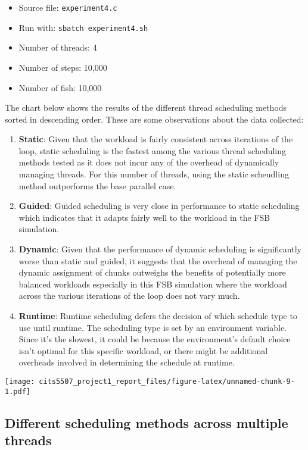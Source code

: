 \documentclass[
]{article}
\providecommand{\tightlist}{%
  \setlength{\itemsep}{0pt}\setlength{\parskip}{0pt}}
\begin{document}
\begin{itemize}
\tightlist
\item
  Source file: \texttt{experiment4.c}
\item
  Run with: \texttt{sbatch\ experiment4.sh}
\item
  Number of threads: 4
\item
  Number of steps: 10,000
\item
  Number of fish: 10,000
\end{itemize}

The chart below shows the results of the different thread scheduling
methods sorted in descending order. These are some observations about
the data collected:

\begin{enumerate}
\def\labelenumi{\arabic{enumi}.}
\item
  \textbf{Static}: Given that the workload is fairly consistent across
  iterations of the loop, static scheduling is the fastest among the
  various thread scheduling methods tested as it does not incur any of
  the overhead of dynamically managing threads. For this number of
  threads, using the static scheudling method outperforms the base
  parallel case.
\item
  \textbf{Guided}: Guided scheduling is very close in performance to
  static scheduling which indicates that it adapts fairly well to the
  workload in the FSB simulation.
\item
  \textbf{Dynamic}: Given that the performance of dynamic scheduling is
  significantly worse than static and guided, it suggests that the
  overhead of managing the dynamic assignment of chunks outweighs the
  benefits of potentially more balanced workloads especially in this FSB
  simulation where the workload across the various iterations of the
  loop does not vary much.
\item
  \textbf{Runtime}: Runtime scheduling defers the decision of which
  schedule type to use until runtime. The scheduling type is set by an
  environment variable. Since it's the slowest, it could be because the
  environment's default choice isn't optimal for this specific workload,
  or there might be additional overheads involved in determining the
  schedule at runtime.
\end{enumerate}

\texttt{[image: cits5507\_project1\_report\_files/figure-latex/unnamed-chunk-9-1.pdf]}

\hypertarget{different-scheduling-methods-across-multiple-threads}{%
\subsection{Different scheduling methods across multiple
threads}\label{different-scheduling-methods-across-multiple-threads}}
\end{document}
